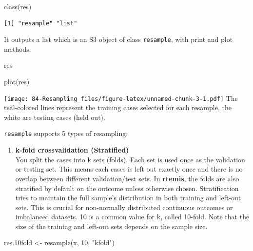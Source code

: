 \documentclass[
]{book}
\newenvironment{Shaded}{\begin{snugshade}}{\end{snugshade}}
\newcommand{\DecValTok}[1]{\textcolor[rgb]{0.00,0.00,0.81}{#1}}
\newcommand{\FloatTok}[1]{\textcolor[rgb]{0.00,0.00,0.81}{#1}}
\newcommand{\FunctionTok}[1]{\textcolor[rgb]{0.00,0.00,0.00}{#1}}
\newcommand{\NormalTok}[1]{#1}
\newcommand{\OtherTok}[1]{\textcolor[rgb]{0.56,0.35,0.01}{#1}}
\newcommand{\StringTok}[1]{\textcolor[rgb]{0.31,0.60,0.02}{#1}}
\providecommand{\tightlist}{%
  \setlength{\itemsep}{0pt}\setlength{\parskip}{0pt}}
\begin{document}
\begin{Shaded}
\begin{Highlighting}[]
\FunctionTok{class}\NormalTok{(res)}
\end{Highlighting}
\end{Shaded}

\begin{verbatim}
[1] "resample" "list"    
\end{verbatim}

It outputs a list which is an S3 object of class \texttt{resample}, with print and plot methods.

\begin{Shaded}
\begin{Highlighting}[]
\NormalTok{res}
\end{Highlighting}
\end{Shaded}

\begin{Shaded}
\begin{Highlighting}[]
\FunctionTok{plot}\NormalTok{(res)}
\end{Highlighting}
\end{Shaded}

\texttt{[image: 84-Resampling\_files/figure-latex/unnamed-chunk-3-1.pdf]}
The teal-colored lines represent the training cases selected for each resample, the white are testing cases (held out).

\texttt{resample} supports 5 types of resampling:

\begin{enumerate}
\def\labelenumi{\arabic{enumi}.}
\tightlist
\item
  \textbf{k-fold crossvalidation (Stratified)}\\
  You split the cases into k sets (folds). Each set is used once as the validation or testing set. This means each cases is left out exactly once and there is no overlap between different validation/test sets. In \textbf{rtemis}, the folds are also stratified by default on the outcome unless otherwise chosen. Stratification tries to maintain the full sample's distribution in both training and left-out sets. This is crucial for non-normally distributed continuous outcomes or \protect\hyperlink{imbalanced}{imbalanced datasets}. 10 is a common value for k, called 10-fold. Note that the size of the training and left-out sets depends on the sample size.
\end{enumerate}

\begin{Shaded}
\begin{Highlighting}[]
\NormalTok{res}\FloatTok{.10}\NormalTok{fold }\OtherTok{\textless{}{-}} \FunctionTok{resample}\NormalTok{(x, }\DecValTok{10}\NormalTok{, }\StringTok{"kfold"}\NormalTok{)}
\end{Highlighting}
\end{Shaded}
\end{document}

